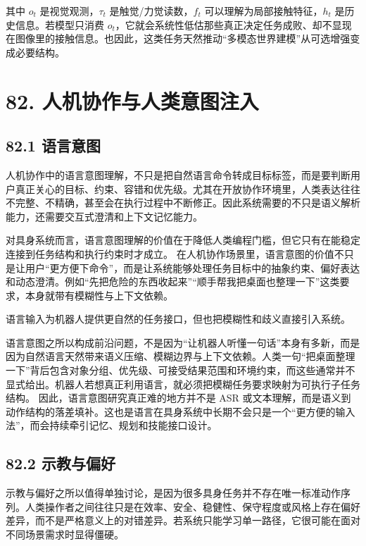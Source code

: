 其中 \(o_t\) 是视觉观测，\(\tau_t\) 是触觉/力觉读数，\(f_t\) 可以理解为局部接触特征，\(h_t\) 是历史信息。若模型只消费 \(o_t\)，它就会系统性低估那些真正决定任务成败、却不显现在图像里的接触信息。也因此，这类任务天然推动“多模态世界建模”从可选增强变成必要结构。

\chapter*{82. 人机协作与人类意图注入}

\section*{82.1 语言意图}


人机协作中的语言意图理解，不只是把自然语言命令转成目标标签，而是要判断用户真正关心的目标、约束、容错和优先级。尤其在开放协作环境里，人类表达往往不完整、不精确，甚至会在执行过程中不断修正。因此系统需要的不只是语义解析能力，还需要交互式澄清和上下文记忆能力。

对具身系统而言，语言意图理解的价值在于降低人类编程门槛，但它只有在能稳定连接到任务结构和执行约束时才成立。 在人机协作场景里，语言意图的价值不只是让用户“更方便下命令”，而是让系统能够处理任务目标中的抽象约束、偏好表达和动态澄清。例如“先把危险的东西收起来”“顺手帮我把桌面也整理一下”这类要求，本身就带有模糊性与上下文依赖。

语言输入为机器人提供更自然的任务接口，但也把模糊性和歧义直接引入系统。

语言意图之所以构成前沿问题，不是因为“让机器人听懂一句话”本身有多新，而是因为自然语言天然带来语义压缩、模糊边界与上下文依赖。人类一句“把桌面整理一下”背后包含对象分组、优先级、可接受结果范围和环境约束，而这些通常并不显式给出。机器人若想真正利用语言，就必须把模糊任务要求映射为可执行子任务结构。 因此，语言意图研究真正难的地方并不是 ASR 或文本理解，而是语义到动作结构的落差填补。这也是语言在具身系统中长期不会只是一个“更方便的输入法”，而会持续牵引记忆、规划和技能接口设计。

\section*{82.2 示教与偏好}


示教与偏好之所以值得单独讨论，是因为很多具身任务并不存在唯一标准动作序列。人类操作者之间往往只是在效率、安全、稳健性、保守程度或风格上存在偏好差异，而不是严格意义上的对错差异。若系统只能学习单一路径，它很可能在面对不同场景需求时显得僵硬。

